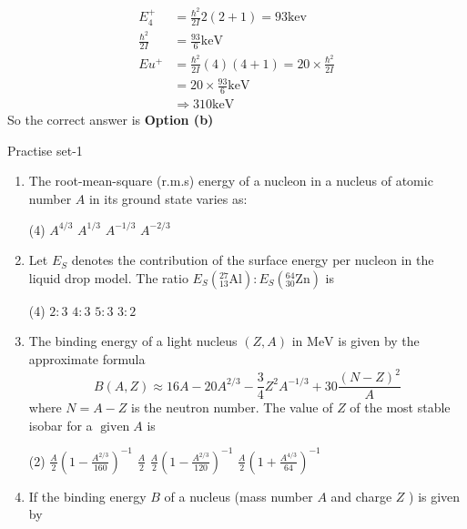 \begin{answer}
	\begin{align*}
	E_{4}^{+}&=\frac{\hbar^{2}}{2 I} 2(2+1)=93 \mathrm{kev} \\
	\frac{\hbar^{2}}{2 I}&=\frac{93}{6} \mathrm{keV}\\
	E u^{+}&=\frac{\hbar^{2}}{2 I}(4)(4+1)=20 \times \frac{\hbar^{2}}{2 I}\\
	&=20 \times \frac{93}{6} \mathrm{keV} \\
	&\Rightarrow 310 \mathrm{keV}
	\end{align*}
	So the correct answer is \textbf{Option (b)}
\end{answer}
\newpage
\begin{abox}
	Practise set-1
\end{abox}
\begin{enumerate}
	\item  The root-mean-square (r.m.s) energy of a nucleon in a nucleus of atomic number $A$ in its ground state varies as:
	 \begin{tasks}(4)
		\task[\textbf{a.}]$A^{4 / 3}$
		\task[\textbf{b.}]$A^{1 / 3}$
		\task[\textbf{c.}]$A^{-1 / 3}$
		\task[\textbf{d.}]$A^{-2 / 3}$ 
	\end{tasks}
	\item  Let $E_S$ denotes the contribution of the surface energy per nucleon in the liquid drop model. The ratio $E_S\left({ }_{13}^{27} \mathrm{Al}\right): E_S\left({ }_{30}^{64} \mathrm{Zn}\right)$ is
	{}
	 \begin{tasks}(4)
		\task[\textbf{a.}]$2: 3$
		\task[\textbf{b.}]$4: 3$
		\task[\textbf{c.}]$5: 3$
		\task[\textbf{d.}]$3: 2$ 
	\end{tasks}
	\item  The binding energy of a light nucleus $(Z, A)$ in $\mathrm{MeV}$ is given by the approximate formula
	$$
	B(A, Z) \approx 16 A-20 A^{2 / 3}-\frac{3}{4} Z^2 A^{-1 / 3}+30 \frac{(N-Z)^2}{A}
	$$
	where $N=A-Z$ is the neutron number. The value of $Z$ of the most stable isobar for a $\operatorname{given} A$ is
	{}
 \begin{tasks}(2)
	\task[\textbf{a.}] $\frac{A}{2}\left(1-\frac{A^{2 / 3}}{160}\right)^{-1}$
	\task[\textbf{b.}]$\frac{A}{2}$
	\task[\textbf{c.}]$\frac{A}{2}\left(1-\frac{A^{2 / 3}}{120}\right)^{-1}$
	\task[\textbf{d.}] $\frac{A}{2}\left(1+\frac{A^{4 / 3}}{64}\right)^{-1}$
\end{tasks}
	\item  If the binding energy $B$ of a nucleus (mass number $A$ and charge $Z$ ) is given by

\end{enumerate}
